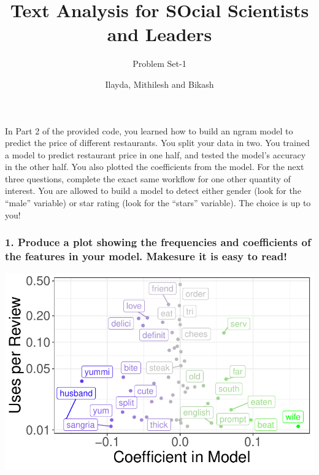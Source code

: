 \documentclass[
  letterpaper,
  DIV=11,
  numbers=noendperiod]{scrartcl}
\title{Text Analysis for SOcial Scientists and Leaders}
\subtitle{Problem Set-1}
\author{Ilayda, Mithilesh and Bikash}
\date{}
\begin{document}
\maketitle
\ifdefined\Shaded\renewenvironment{Shaded}{\begin{tcolorbox}[boxrule=0pt, sharp corners, borderline west={3pt}{0pt}{shadecolor}, enhanced, frame hidden, breakable, interior hidden]}{\end{tcolorbox}}\fi

In Part 2 of the provided code, you learned how to build an ngram model
to predict the price of different restaurants. You split your data in
two. You trained a model to predict restaurant price in one half, and
tested the model's accuracy in the other half. You also plotted the
coefficients from the model. For the next three questions, complete the
exact same workflow for one other quantity of interest. You are allowed
to build a model to detect either gender (look for the ``male''
variable) or star rating (look for the ``stars'' variable). The choice
is up to you!

\hypertarget{produce-a-plot-showing-the-frequencies-and-coefficients-of-the-features-in-your-model.-makesure-it-is-easy-to-read}{%
\subsubsection{1. Produce a plot showing the frequencies and
coefficients of the features in your model. Makesure it is easy to
read!}\label{produce-a-plot-showing-the-frequencies-and-coefficients-of-the-features-in-your-model.-makesure-it-is-easy-to-read}}

\includegraphics{nlp_ps_1_files/figure-pdf/unnamed-chunk-1-1.pdf}
\end{document}
